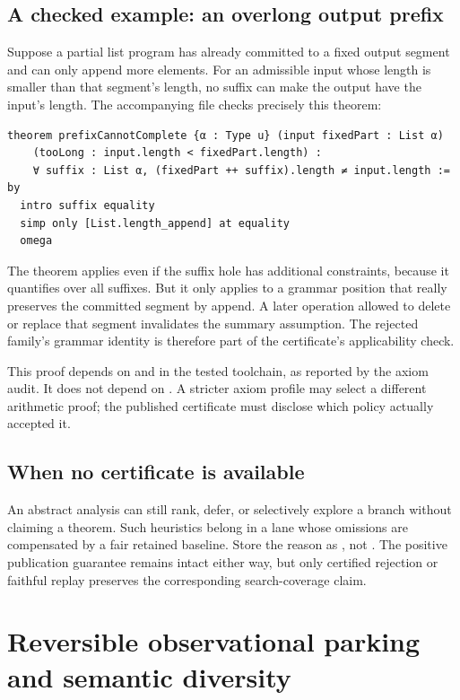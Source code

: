\subsection{A checked example: an overlong output prefix}
Suppose a partial list program has already committed to a fixed output segment and can only append more elements. For an admissible input whose length is smaller than that segment's length, no suffix can make the output have the input's length. The accompanying file checks precisely this theorem:
\begin{lstlisting}[caption={Checked completion-wide rejection theorem.}]
theorem prefixCannotComplete {α : Type u} (input fixedPart : List α)
    (tooLong : input.length < fixedPart.length) :
    ∀ suffix : List α, (fixedPart ++ suffix).length ≠ input.length := by
  intro suffix equality
  simp only [List.length_append] at equality
  omega
\end{lstlisting}
The theorem applies even if the suffix hole has additional constraints, because it quantifies over all suffixes. But it only applies to a grammar position that really preserves the committed segment by append. A later operation allowed to delete or replace that segment invalidates the summary assumption. The rejected family's grammar identity is therefore part of the certificate's applicability check.

This proof depends on  and  in the tested toolchain, as reported by the axiom audit. It does not depend on . A stricter axiom profile may select a different arithmetic proof; the published certificate must disclose which policy actually accepted it.

\subsection{When no certificate is available}
An abstract analysis can still rank, defer, or selectively explore a branch without claiming a theorem. Such heuristics belong in a lane whose omissions are compensated by a fair retained baseline. Store the reason as , not . The positive publication guarantee remains intact either way, but only certified rejection or faithful replay preserves the corresponding search-coverage claim.

\section{Reversible observational parking and semantic diversity}
\label{sec:parking}
